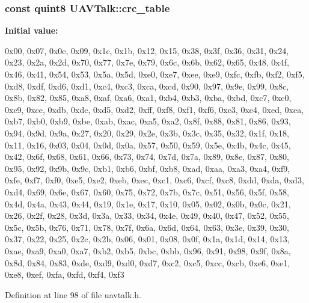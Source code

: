 \hypertarget{group___u_a_v_talk_plugin_gac5c5c810a2edb31ed325bf2d54e1b289}{
\subsubsection[{crc\-\_\-table}]{\setlength{\rightskip}{0pt plus 5cm}const quint8 {\bf \-U\-A\-V\-Talk\-::crc\-\_\-table}}}\label{group___u_a_v_talk_plugin_gac5c5c810a2edb31ed325bf2d54e1b289}
{\bfseries \-Initial value\-:}
\begin{DoxyCode}
 {
    0x00, 0x07, 0x0e, 0x09, 0x1c, 0x1b, 0x12, 0x15, 0x38, 0x3f, 0x36, 0x31, 
      0x24, 0x23, 0x2a, 0x2d,
    0x70, 0x77, 0x7e, 0x79, 0x6c, 0x6b, 0x62, 0x65, 0x48, 0x4f, 0x46, 0x41, 
      0x54, 0x53, 0x5a, 0x5d,
    0xe0, 0xe7, 0xee, 0xe9, 0xfc, 0xfb, 0xf2, 0xf5, 0xd8, 0xdf, 0xd6, 0xd1, 
      0xc4, 0xc3, 0xca, 0xcd,
    0x90, 0x97, 0x9e, 0x99, 0x8c, 0x8b, 0x82, 0x85, 0xa8, 0xaf, 0xa6, 0xa1, 
      0xb4, 0xb3, 0xba, 0xbd,
    0xc7, 0xc0, 0xc9, 0xce, 0xdb, 0xdc, 0xd5, 0xd2, 0xff, 0xf8, 0xf1, 0xf6, 
      0xe3, 0xe4, 0xed, 0xea,
    0xb7, 0xb0, 0xb9, 0xbe, 0xab, 0xac, 0xa5, 0xa2, 0x8f, 0x88, 0x81, 0x86, 
      0x93, 0x94, 0x9d, 0x9a,
    0x27, 0x20, 0x29, 0x2e, 0x3b, 0x3c, 0x35, 0x32, 0x1f, 0x18, 0x11, 0x16, 
      0x03, 0x04, 0x0d, 0x0a,
    0x57, 0x50, 0x59, 0x5e, 0x4b, 0x4c, 0x45, 0x42, 0x6f, 0x68, 0x61, 0x66, 
      0x73, 0x74, 0x7d, 0x7a,
    0x89, 0x8e, 0x87, 0x80, 0x95, 0x92, 0x9b, 0x9c, 0xb1, 0xb6, 0xbf, 0xb8, 
      0xad, 0xaa, 0xa3, 0xa4,
    0xf9, 0xfe, 0xf7, 0xf0, 0xe5, 0xe2, 0xeb, 0xec, 0xc1, 0xc6, 0xcf, 0xc8, 
      0xdd, 0xda, 0xd3, 0xd4,
    0x69, 0x6e, 0x67, 0x60, 0x75, 0x72, 0x7b, 0x7c, 0x51, 0x56, 0x5f, 0x58, 
      0x4d, 0x4a, 0x43, 0x44,
    0x19, 0x1e, 0x17, 0x10, 0x05, 0x02, 0x0b, 0x0c, 0x21, 0x26, 0x2f, 0x28, 
      0x3d, 0x3a, 0x33, 0x34,
    0x4e, 0x49, 0x40, 0x47, 0x52, 0x55, 0x5c, 0x5b, 0x76, 0x71, 0x78, 0x7f, 
      0x6a, 0x6d, 0x64, 0x63,
    0x3e, 0x39, 0x30, 0x37, 0x22, 0x25, 0x2c, 0x2b, 0x06, 0x01, 0x08, 0x0f, 
      0x1a, 0x1d, 0x14, 0x13,
    0xae, 0xa9, 0xa0, 0xa7, 0xb2, 0xb5, 0xbc, 0xbb, 0x96, 0x91, 0x98, 0x9f, 
      0x8a, 0x8d, 0x84, 0x83,
    0xde, 0xd9, 0xd0, 0xd7, 0xc2, 0xc5, 0xcc, 0xcb, 0xe6, 0xe1, 0xe8, 0xef, 
      0xfa, 0xfd, 0xf4, 0xf3
}
\end{DoxyCode}


\-Definition at line 98 of file uavtalk.\-h.

